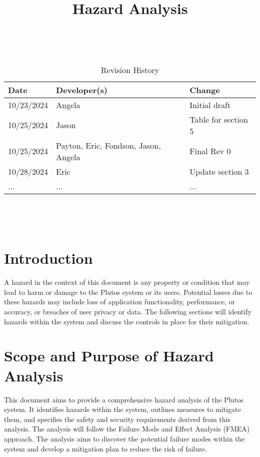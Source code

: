 \documentclass{article}
\title{Hazard Analysis\\\progname}
\author{\authname}
\date{}
\begin{document}
\maketitle
\thispagestyle{empty}

~\newpage


\begin{table}[hp]
\caption{Revision History} \label{TblRevisionHistory}
\begin{tabularx}{\textwidth}{llX}
\toprule
\textbf{Date} & \textbf{Developer(s)} & \textbf{Change}\\
\midrule
10/23/2024 & Angela & Initial draft\\
10/25/2024 & Jason & Table for section 5 \\
10/25/2024 & Payton, Eric, Fondson, Jason, Angela & Final Rev 0 \\
10/28/2024 & Eric & Update section 3\\
... & ... & ... \\
\bottomrule
\end{tabularx}
\end{table}

~\newpage

\tableofcontents

~\newpage


\section{Introduction}

A hazard in the context of this document is any property or condition that may
lead to harm or damage to the Plutos system or its users. Potential losses due
to these hazards may include loss of application functionality, performance, or
accuracy, or breaches of user privacy or data. The following sections will
identify hazards within the system and discuss the controls in place for their
mitigation.


\section{Scope and Purpose of Hazard Analysis}

This document aims to provide a comprehensive hazard analysis of the Plutos
system. It identifies hazards within the system, outlines measures to mitigate
them, and specifies the safety and security requirements derived from this
analysis. The analysis will follow the Failure Mode and Effect Analysis (FMEA)
approach. The analysis aims to discover the potential failure modes within the
system and develop a mitigation plan to reduce the risk of failure. 
\end{document}
